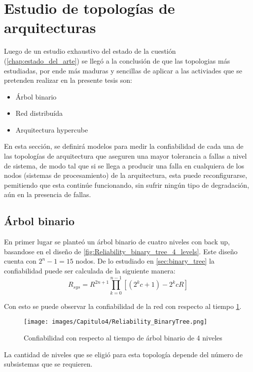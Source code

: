 \section{Estudio de topologías de arquitecturas}\label{seccion:TopologiaEstudio}
Luego de un estudio exhaustivo del estado de la cuestión (\autoref{chap:estado_del_arte}) se llegó a la conclusión de que las topologias más estudiadas, por ende más maduras y sencillas de aplicar a las activiades que se pretenden realizar en la presente tesis son:
\begin{itemize}
  \item Árbol binario
  \item Red distribuída
  \item Arquitectura hypercube
\end{itemize}

En esta sección, se definirá modelos para medir la confiabilidad de cada una de las topologías de arquitectura que aseguren una mayor tolerancia a fallas a nivel de sistema, de modo tal que si se llega a producir una falla en cualquiera de los nodos (sistemas de procesamiento) de la arquitectura, esta puede reconfigurarse, pemitiendo que esta continúe funcionando, sin sufrir ningún tipo de degradación, aún en la presencia de fallas.

\subsection{Árbol binario}
En primer lugar se planteó un árbol binario de cuatro niveles con back up, basandose en el diseño de \cite{Raghavendra84} \ref{fig:Reliability_binary_tree_4_levels}. Este diseño cuenta con $2^n - 1 =  15$ nodos. De lo estudiado en \autoref{sec:binary_tree} la confiabilidad puede ser calculada de la siguiente manera: $$R_{sys} = R^{2n +1} \prod_{k=0}^{n-1}{[(2^kc+1) - 2^kcR]}$$

Con esto se puede observar la confiabilidad de la red con respecto al tiempo \ref{fig:Reliability_binary_tree_4_levels_2}.

\begin{figure}[H]
 \centering
 \texttt{[image: images/Capitulo4/Reliability\_BinaryTree.png]}
  \caption{Confiabilidad con respecto al tiempo de árbol binario de 4 niveles}
\label{fig:Reliability_binary_tree_4_levels_2}
\end{figure}

La cantidad de niveles que se eligió para esta topología depende del número de subsistemas que se requieren.

